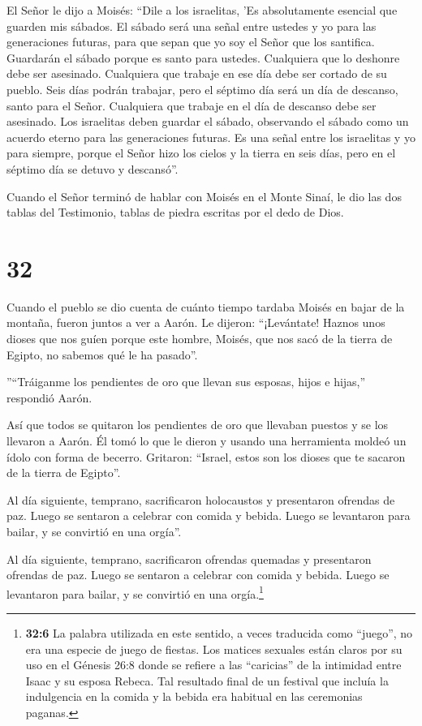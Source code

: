  El Señor le dijo a Moisés:  ``Dile a los
israelitas, 'Es absolutamente esencial que guarden mis sábados. El
sábado será una señal entre ustedes y yo para las generaciones futuras,
para que sepan que yo soy el Señor que los santifica. 
Guardarán el sábado porque es santo para ustedes. Cualquiera que lo
deshonre debe ser asesinado. Cualquiera que trabaje en ese día debe ser
cortado de su pueblo.  Seis días podrán trabajar, pero el
séptimo día será un día de descanso, santo para el Señor. Cualquiera que
trabaje en el día de descanso debe ser asesinado.  Los
israelitas deben guardar el sábado, observando el sábado como un acuerdo
eterno para las generaciones futuras.  Es una señal entre
los israelitas y yo para siempre, porque el Señor hizo los cielos y la
tierra en seis días, pero en el séptimo día se detuvo y descansó''.

 Cuando el Señor terminó de hablar con Moisés en el Monte
Sinaí, le dio las dos tablas del Testimonio, tablas de piedra escritas
por el dedo de Dios.

\hypertarget{section-31}{%
\section{32}\label{section-31}}

 Cuando el pueblo se dio cuenta de cuánto tiempo tardaba
Moisés en bajar de la montaña, fueron juntos a ver a Aarón. Le dijeron:
``¡Levántate! Haznos unos dioses que nos guíen porque este hombre,
Moisés, que nos sacó de la tierra de Egipto, no sabemos qué le ha
pasado''.

 ''``Tráiganme los pendientes de oro que llevan sus esposas,
hijos e hijas,'' respondió Aarón.

 Así que todos se quitaron los pendientes de oro que
llevaban puestos y se los llevaron a Aarón.  Él tomó lo que
le dieron y usando una herramienta moldeó un ídolo con forma de becerro.
Gritaron: ``Israel, estos son los dioses que te sacaron de la tierra de
Egipto''.

 Al día siguiente, temprano, sacrificaron holocaustos y
presentaron ofrendas de paz. Luego se sentaron a celebrar con comida y
bebida. Luego se levantaron para bailar, y se convirtió en una orgía''.

 Al día siguiente, temprano, sacrificaron ofrendas quemadas
y presentaron ofrendas de paz. Luego se sentaron a celebrar con comida y
bebida. Luego se levantaron para bailar, y se convirtió en una
orgía.\footnote{\textbf{32:6} La palabra utilizada en este sentido, a
  veces traducida como ``juego'', no era una especie de juego de
  fiestas. Los matices sexuales están claros por su uso en el Génesis
  26:8 donde se refiere a las ``caricias'' de la intimidad entre Isaac y
  su esposa Rebeca. Tal resultado final de un festival que incluía la
  indulgencia en la comida y la bebida era habitual en las ceremonias
  paganas.}

